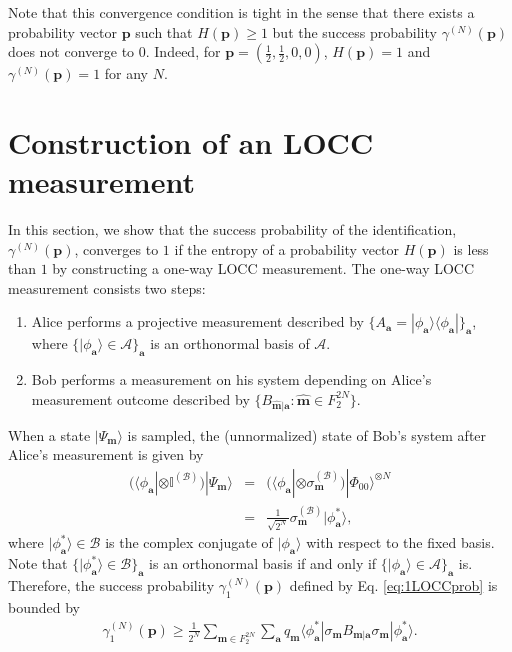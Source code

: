 \documentclass[aps,prx,twocolumn,showpacs,amsmath,notitlepage,amssymb,superscriptaddress]{revtex4-1}
\newcommand{\bra}[1]{\langle {#1} |}
\newcommand{\ket}[1]{| {#1} \rangle}
\begin{document}
Note that this convergence condition is tight in the sense that there exists a probability vector $\mathbf{p}$ such that $H(\mathbf{p})\geq1$ but the success probability $\gamma^{(N)}(\mathbf{p})$ does not converge to $0$. Indeed, for $\mathbf{p}=\left(\frac{1}{2},\frac{1}{2},0,0\right)$, $H(\mathbf{p})=1$ and $\gamma^{(N)}(\mathbf{p})=1$ for any $N$. 


\section{Construction of an LOCC measurement}
\label{sec:construction}
In this section, we show that the success probability of the identification, $\gamma^{(N)}(\mathbf{p})$, converges to $1$ if the entropy of a probability vector $H(\mathbf{p})$ is less than $1$ by constructing a one-way LOCC measurement.
The one-way LOCC measurement consists two steps:
\begin{enumerate}
 \item Alice performs a projective measurement described by $\{A_{\mathbf{a}}=\ket{\phi_{\mathbf{a}}}\bra{\phi_{\mathbf{a}}}\}_{\mathbf{a}}$, where $\{\ket{\phi_{\mathbf{a}}}\in\mathcal{A}\}_{\mathbf{a}}$ is an orthonormal basis of $\mathcal{A}$. 
 
 \item Bob performs a measurement on his system depending on Alice's measurement outcome described by $\{B_{\hat{\mathbf{m}}|\mathbf{a}}:\hat{\mathbf{m}}\in F_2^{2N}\}$. 
 \end{enumerate}

When a state $\ket{\Psi_{\mathbf{m}}}$ is sampled, the (unnormalized) state of Bob's system after Alice's measurement is given by
\begin{eqnarray}
 (\bra{\phi_{\mathbf{a}}}\otimes\mathbb{I}^{(\mathcal{B})})\ket{\Psi_{\mathbf{m}}}&=&(\bra{\phi_{\mathbf{a}}}\otimes\sigma_{\mathbf{m}}^{(\mathcal{B})})\ket{\Phi_{00}}^{\otimes N}\\
 &=&\frac{1}{\sqrt{2^N}}\sigma_{\mathbf{m}}^{(\mathcal{B})}\ket{\phi^*_{\mathbf{a}}},
\end{eqnarray}
where $\ket{\phi^*_{\mathbf{a}}}\in\mathcal{B}$ is the complex conjugate of $\ket{\phi_{\mathbf{a}}}$ with respect to the fixed basis. Note that $\{\ket{\phi^*_{\mathbf{a}}}\in\mathcal{B}\}_{\mathbf{a}}$ is an orthonormal basis if and only if $\{\ket{\phi_{\mathbf{a}}}\in\mathcal{A}\}_{\mathbf{a}}$ is. Therefore, the success probability $\gamma_1^{(N)}(\mathbf{p})$ defined by Eq. \eqref{eq:1LOCCprob} is bounded by
\begin{eqnarray}
\label{eq:lowerbound}
 \gamma_1^{(N)}(\mathbf{p})\geq\frac{1}{2^N}\sum_{\mathbf{m}\in F_2^{2N}}\sum_{\mathbf{a}}q_{\mathbf{m}}\bra{\phi^*_{\mathbf{a}}}\sigma_{\mathbf{m}}B_{\mathbf{m}|\mathbf{a}}\sigma_{\mathbf{m}}\ket{\phi^*_{\mathbf{a}}}.
\end{eqnarray}
\end{document}
